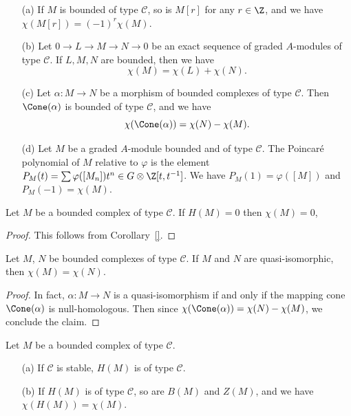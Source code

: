 \begin{example}
\mbox{}
\begin{itemize}
\item[(a)] If $M$ is bounded of type $\mathscr{C}$, so is $M[r]$ for any $r\in\Z$, and we have $\chi(M[r])=(-1)^r\chi(M)$.
\item[(b)] Let $0\to L\to M\to N\to 0$ be an exact sequence of graded $A$-modules of type $\mathscr{C}$. If $L,M,N$ are bounded, then we have
\[\chi(M)=\chi(L)+\chi(N).\] 
\item[(c)] Let $\alpha:M\to N$ be a morphism of bounded complexes of type $\mathscr{C}$. Then $\Cone(\alpha)$ is bounded of type $\mathscr{C}$, and we have
\[\chi(\Cone(\alpha))=\chi(N)-\chi(M).\]
\item[(d)] Let $M$ be a graded $A$-module bounded and of type $\mathscr{C}$. The Poincar\'e polynomial of $M$ relative to $\varphi$ is the element $P_M(t)=\sum\varphi([M_n])t^n\in G\otimes\Z[t,t^{-1}]$. We have $P_M(1)=\varphi([M])$ and $P_M(-1)=\chi(M)$. 
\end{itemize}
\end{example}
\begin{lemma}\label{module complex chi zero if exact}
Let $M$ be a bounded complex of type $\mathscr{C}$. If $H(M)=0$ then $\chi(M)=0$,
\end{lemma}
\begin{proof}
This follows from Corollary~\ref{}.
\end{proof}
\begin{proposition}\label{module complex quasi-iso same chi}
Let $M$, $N$ be bounded complexes of type $\mathscr{C}$. If $M$ and $N$ are quasi-isomorphic, then $\chi(M)=\chi(N)$.
\end{proposition}
\begin{proof}
In fact, $\alpha:M\to N$ is a quasi-isomorphism if and only if the mapping cone $\Cone(\alpha)$ is null-homologous. Then since $\chi(\Cone(\alpha))=\chi(N)-\chi(M)$, we conclude the claim.
\end{proof}
\begin{proposition}\label{module complex chi of homology prop}
Let $M$ be a bounded complex of type $\mathscr{C}$.
\begin{itemize}
\item[(a)] If $\mathscr{C}$ is stable, $H(M)$ is of type $\mathscr{C}$.
\item[(b)] If $H(M)$ is of type $\mathscr{C}$, so are $B(M)$ and $Z(M)$, and we have $\chi(H(M))=\chi(M)$.
\end{itemize}
\end{proposition}
